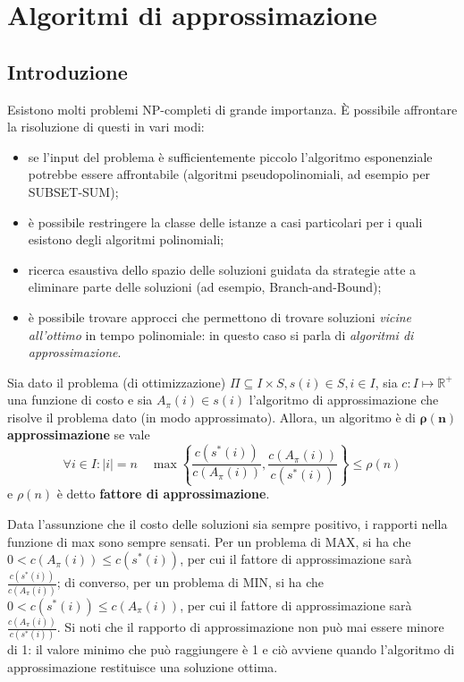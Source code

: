 \chapter{Algoritmi di approssimazione}\label{ch:algapprox}
\setcounter{page}{1}
\section{Introduzione}
Esistono molti problemi NP-completi di grande importanza. È possibile affrontare la risoluzione di questi in vari modi:
\begin{itemize}
\item se l'input del problema è sufficientemente piccolo l'algoritmo esponenziale potrebbe essere affrontabile (algoritmi pseudopolinomiali, ad esempio per SUBSET-SUM);
\item è possibile restringere la classe delle istanze a casi particolari per i quali esistono degli algoritmi polinomiali;
\item ricerca esaustiva dello spazio delle soluzioni guidata da strategie atte a eliminare parte delle soluzioni (ad esempio, Branch-and-Bound);
\item è possibile trovare approcci che permettono di trovare soluzioni \textit{vicine all'ottimo} in tempo polinomiale: in questo caso si parla di \textit{algoritmi di approssimazione}.
\end{itemize}


Sia dato il problema (di ottimizzazione) $\Pi \subseteq \mathit{I} \times \mathit{S}, s(i) \in \mathit{S}, i \in \mathit{I}$, sia $c: \mathit{I} \mapsto \mathbb{R}^{+}$ una funzione di costo e sia $A_\pi(i) \in s(i)$ l'algoritmo di approssimazione che risolve il problema dato (in modo approssimato). Allora, un algoritmo è di $\mathbf{\rho (n)}$ \textbf{approssimazione} se vale
\[
\forall i \in \mathit{I} : |i|=n \quad \max\left\lbrace\frac{c(s^*(i))}{c(A_\pi(i))},\frac{c(A_\pi(i))}{c(s^*(i))}\right\rbrace \leq \rho (n)
\]
e $\rho (n)$ è detto \textbf{fattore di approssimazione}.

Data l'assunzione che il costo delle soluzioni sia sempre positivo, i rapporti nella funzione di max sono sempre sensati.
Per un problema di MAX, si ha che $0 < c(A_\pi(i)) \leq c(s^*(i))$, per cui il fattore di approssimazione sarà $\frac{c(s^*(i))}{c(A_\pi(i))}$; di converso, per un problema di MIN, si ha che $0 < c(s^*(i)) \leq c(A_\pi(i))$, per cui il fattore di approssimazione sarà $\frac{c(A_\pi(i))}{c(s^*(i))}$. Si noti che il rapporto di approssimazione non può mai essere minore di 1: il valore minimo che può raggiungere è 1 e ciò avviene quando l'algoritmo di approssimazione restituisce una soluzione ottima.

